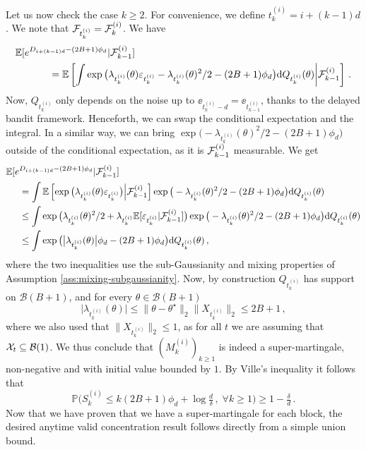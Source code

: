 Let us now check the case $k\geq 2$. For convenience, we define $t_k^{(i)} = i + (k-1)d$. We note that $\mathcal{F}_{t_k^{(i)}} = \mathcal{F}_k^{(i)}$. We have
\begin{align*}\mathbb{E}[e&^{D_{i+(k-1)d}-(2B+1)\phi_d}|\mathcal{F}^{(i)}_{k-1}] \\&\qquad= \mathbb{E}\left[\int \exp\big(\lambda_{t_k^{(i)}}(\theta)\varepsilon_{t_k^{(i)}} - \lambda_{t_k^{(i)}}(\theta)^2/2 - (2B+1)\phi_d\big)\mathrm dQ_{t_k^{(i)}}(\theta)\middle|\mathcal{F}_{k-1}^{(i)}\right]\,.\end{align*}
Now, $Q_{t_k^{(i)}}$ only depends on the noise up to $\ee_{t_k^{(i)}-d} = \ee_{t_{k-1}^{(i)}}$, thanks to the delayed bandit framework. Henceforth, we can swap the conditional expectation and the integral. In a similar way, we can bring $\exp\big( - \lambda_{t_k^{(i)}}(\theta)^2/2 - (2B+1)\phi_d\big)$ outside of the conditional expectation, as it is $\mathcal{F}_{k-1}^{(i)}$ measurable. We get 
\begin{align*}
	\mathbb{E}[e&^{D_{i+(k-1)d}-(2B+1)\phi_d}|\mathcal{F}^{(i)}_{k-1}] \\&= \int \mathbb{E}\left[\exp\big(\lambda_{t_k^{(i)}}(\theta)\varepsilon_{t_k^{(i)}}\big) \middle|\mathcal{F}_{k-1}^{(i)}\right]\exp\big(- \lambda_{t_k^{(i)}}(\theta)^2/2 - (2B+1)\phi_d\big)\mathrm dQ_{t_k^{(i)}}(\theta)\\
	&\leq \int \exp\big(\lambda_{t_k^{(i)}}(\theta)^2/2 + \lambda_{t_k^{(i)}}\mathbb{E}[\varepsilon_{t_k^{(i)}}|\mathcal{F}_{k-1}^{(i)}]\big)\exp\big(- \lambda_{t_k^{(i)}}(\theta)^2/2 - (2B+1)\phi_d\big)\mathrm dQ_{t_k^{(i)}}(\theta)\\
	&\leq \int \exp\big(\big|\lambda_{t_k^{(i)}}(\theta)\big|\phi_d - (2B+1)\phi_d\big)\mathrm dQ_{t_k^{(i)}}(\theta)\,,
\end{align*}
where the two inequalities use the sub-Gaussianity and mixing properties of Assumption \ref{ass:mixing-subgaussianity}. Now, by construction $Q_{t_k^{(i)}}$ has support on $\mathcal B(B+1)$, and for every $\theta\in\mathcal B(B+1)$ $$\big|\lambda_{t_k^{(i)}}(\theta)\big| \leq \|\theta-\theta^\star\|_2\|X_{t_k^{(i)}}\|_2\leq 2B+1\,,$$ where we also used that $\|X_{t_k^{(i)}}\|_2\leq 1$, as for all $t$ we are assuming that $\mathcal{X}_t\subseteq\mathcal B(1)$. We thus conclude that $(M_k^{(i)})_{k\geq 1}$ is indeed a super-martingale, non-negative and with initial value bounded by $1$. By Ville's inequality it follows that 
$$\mathbb P\big(S_k^{(i)}\leq k(2B+1)\phi_d +\log\tfrac{d}{\delta}\,,\;\forall k\geq 1\big)\geq 1-\tfrac{\delta}{d}\,.$$
Now that we have proven that we have a super-martingale for each block, the desired anytime valid concentration result follows directly from a simple union bound. 

